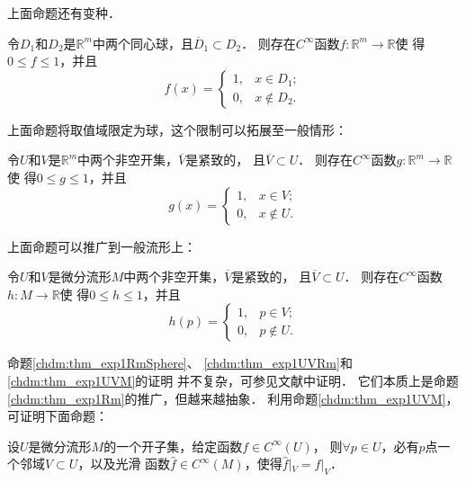 上面命题还有变种．
\begin{proposition}\label{chdm:thm_exp1RmSphere}
    令$D_1$和$D_2$是$\mathbb{R}^m$中两个同心球，且$\overline{D}_1 \subset D_2$．
    则存在$C^\infty$函数$f:\mathbb{R}^m \to \mathbb{R}$使
    得$0\leqslant f \leqslant 1$，并且
    \begin{equation}\label{chdm:eqn_exp1RmSphere}
        f(x)=\begin{cases}
            1, & x\in D_1 ; \\
            0, & x\notin D_2 .
        \end{cases}
    \end{equation}
\end{proposition}
上面命题将取值域限定为球，这个限制可以拓展至一般情形：
\begin{proposition}\label{chdm:thm_exp1UVRm}
    令$U$和$V$是$\mathbb{R}^m$中两个非空开集，$\overline{V}$是紧致的，
    且$\overline{V} \subset U$．
    则存在$C^\infty$函数$g:\mathbb{R}^m \to \mathbb{R}$使
    得$0\leqslant g \leqslant 1$，并且
    \begin{equation}\label{chdm:eqn_exp1UVRm}
        g(x)=\begin{cases}
            1, & x\in V ; \\
            0, & x\notin U .
        \end{cases}
    \end{equation}
\end{proposition}
上面命题可以推广到一般流形上：
\begin{proposition}\label{chdm:thm_exp1UVM}
    令$U$和$V$是微分流形$M$中两个非空开集，$\overline{V}$是紧致的，
    且$\overline{V} \subset U$．
    则存在$C^\infty$函数$h:M \to \mathbb{R}$使
    得$0\leqslant h \leqslant 1$，并且
    \begin{equation}\label{chdm:eqn_exp1UVM}
        h(p)=\begin{cases}
            1, & p\in V ; \\
            0, & p\notin U .
        \end{cases}
    \end{equation}
\end{proposition}
命题\ref{chdm:thm_exp1RmSphere}、
\ref{chdm:thm_exp1UVRm}和\ref{chdm:thm_exp1UVM}的证明
并不复杂，可参见文献\parencite[\S 1.3]{cc2001-zh}中证明．
它们本质上是命题\ref{chdm:thm_exp1Rm}的推广，但越来越抽象．
利用命题\ref{chdm:thm_exp1UVM}，可证明下面命题：
\begin{proposition}\label{chdm:thm_Flocal-equiv-Fglobal}
    设$U$是微分流形$M$的一个开子集，给定函数$f\in C^\infty(U)$，
    则$\forall p\in U$，必有$p$点一个邻域$V\subset U$，以及光滑
    函数$\hat{f}\in C^\infty(M)$，使得$\hat{f}|_V = f|_V$．
\end{proposition}
